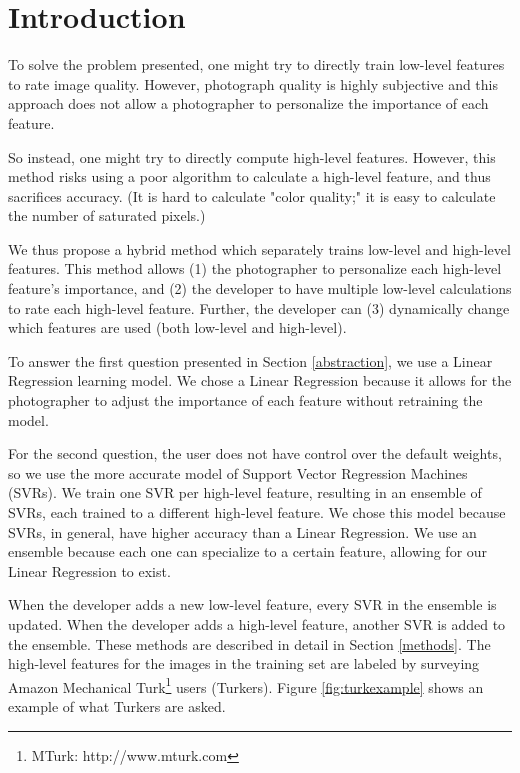 \documentclass[11pt,letter]{article}
\begin{document}
\section{Introduction}
To solve the problem presented, one might try to directly train low-level features to rate image quality. However, photograph quality is highly subjective and this approach does not allow a photographer to personalize the importance of each feature.

So instead, one might try to directly compute high-level features. However, this method risks using a poor algorithm to calculate a high-level feature, and thus sacrifices accuracy. (It is hard to calculate "color quality;" it is easy to calculate the number of saturated pixels.)

We thus propose a hybrid method which separately trains low-level and high-level features. This method allows (1) the photographer to personalize each high-level feature's importance, and (2) the developer to have multiple low-level calculations to rate each high-level feature. Further, the developer can (3) dynamically change which features are used (both low-level and high-level).

To answer the first question presented in Section \ref{abstraction}, we use a Linear Regression learning model. We chose a Linear Regression because it allows for the photographer to adjust the importance of each feature without retraining the model.

For the second question, the user does not have control over the default weights, so we use the more accurate model of Support Vector Regression Machines (SVRs)\cite{springerlink:10.1023/B:STCO.0000035301.49549.88}. We train one SVR per high-level feature, resulting in an ensemble of SVRs, each trained to a different high-level feature. We chose this model because SVRs, in general, have higher accuracy than a Linear Regression. We use an ensemble because each one can specialize to a certain feature, allowing for our Linear Regression to exist. %

When the developer adds a new low-level feature, every SVR in the ensemble is updated. When the developer adds a high-level feature, another SVR is added to the ensemble. These methods are described in detail in Section \ref{methods}. The high-level features for the images in the training set are labeled by surveying Amazon Mechanical Turk\footnote{MTurk: http://www.mturk.com} users (Turkers). Figure \ref{fig:turkexample} shows an example of what Turkers are asked.
\end{document}
